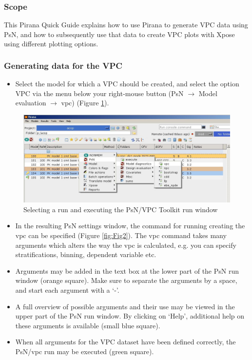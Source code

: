 
\begin{center}
   {\colorbox{grey2}{
         \begin{minipage}[t]{0.9\textwidth}
\subsubsection*{Scope}
This Pirana Quick Guide explains how to use Pirana to generate VPC
data using PsN, and how to subsequently use that data to create VPC plots
with Xpose using different plotting options. 
          \end{minipage}
      }
   }
\end{center}

\subsubsection*{Generating data for the VPC}
\begin{itemize}
\item Select the model for which a VPC should be created, and select
  the option VPC via the menu below your right-mouse button (PsN $
  \rightarrow$ Model evaluation $ \rightarrow$ vpc) (Figure \ref{fig:Fig1}).
\end{itemize}

\begin{figure}[h] \centering
    \includegraphics[scale=.4]{images/vpc_1.jpg}
    \caption{Selecting a run and executing the PsN/VPC Toolkit run window
     \label{fig:Fig1}}
\end{figure}

\begin{itemize}
\item In the resulting PsN settings window, the command for running
  creating the vpc can be specified (Figure \ref{fig:Fig2}). The vpc command takes
  many arguments which alters the way the vpc is calculated, e.g. you
  can specify stratifications, binning, dependent variable etc.
\item Arguments may be added in the text box at the lower part of the
  PsN run window (orange square). Make sure to separate the arguments
  by a space, and start each argument with a `-'.
\item A full overview of possible arguments and their use may be
  viewed in the upper part of the PsN run window. By clicking on
  `Help', additional help on these arguments is available (small blue square).
\item When all arguments for the VPC dataset have been defined
  correctly, the PsN/vpc run may be executed (green square).
\end{itemize}


